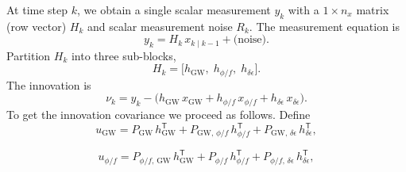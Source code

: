 \documentclass{tufte-handout} %
\begin{document}
At time step $k$, we obtain a single scalar measurement $y_k$ with a $1\times n_x$ matrix (row vector) $H_k$ and scalar measurement noise $R_k$. The measurement equation is
\begin{equation}
	y_k = H_k\,x_{k\mid k-1} + \text{(noise)}.
\end{equation}
 Partition $H_k$ into three sub-blocks,
\begin{equation}
	H_k 
	=
	\bigl[
	h_{\mathrm{GW}},\;
	h_{\phi/f},\;
	h_{\delta\epsilon}
	\bigr].
\end{equation}
The innovation is
\begin{equation}
	\nu_k
	=
	y_k 
	-
	\bigl(
	h_{\mathrm{GW}}\,x_{\mathrm{GW}}
	+
	h_{\phi/f}\,x_{\phi/f}
	+
	h_{\delta\epsilon}\,x_{\delta\epsilon}
	\bigr).
\end{equation}
To get the innovation covariance we proceed as follows. Define
\begin{equation}
	u_{\mathrm{GW}}
	=
	P_{\mathrm{GW}}\,h_{\mathrm{GW}}^\mathsf{T}
	+
	P_{\mathrm{GW},\,\phi/f}\,h_{\phi/f}^\mathsf{T}
	+
	P_{\mathrm{GW},\,\delta\epsilon}\,h_{\delta\epsilon}^\mathsf{T},
\end{equation}

\begin{equation}
	u_{\phi/f}
	=
	P_{\phi/f,\,\mathrm{GW}}\,h_{\mathrm{GW}}^\mathsf{T}
	+
	P_{\phi/f}\,h_{\phi/f}^\mathsf{T}
	+
	P_{\phi/f,\,\delta\epsilon}\,h_{\delta\epsilon}^\mathsf{T},
\end{equation}
\end{document}

